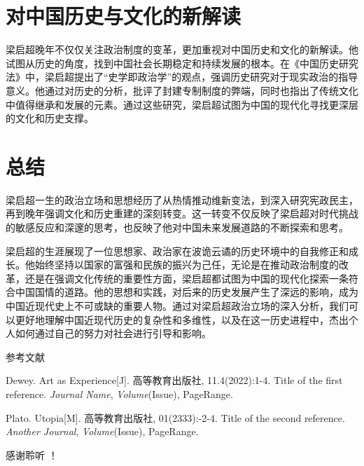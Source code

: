 \documentclass[10pt,a4paper]{beamer} %
\begin{document}
	\section{对中国历史与文化的新解读}
	\begin{frame}
		梁启超晚年不仅仅关注政治制度的变革，更加重视对中国历史和文化的新解读。他试图从历史的角度，找到中国社会长期稳定和持续发展的根本。在《中国历史研究法》中，梁启超提出了“史学即政治学”的观点，强调历史研究对于现实政治的指导意义。他通过对历史的分析，批评了封建专制制度的弊端，同时也指出了传统文化中值得继承和发展的元素。通过这些研究，梁启超试图为中国的现代化寻找更深层的文化和历史支撑。
	\end{frame}
	\section{总结}
	\begin{frame}
		梁启超一生的政治立场和思想经历了从热情推动维新变法，到深入研究宪政民主，再到晚年强调文化和历史重建的深刻转变。这一转变不仅反映了梁启超对时代挑战的敏感反应和深邃的思考，也反映了他对中国未来发展道路的不断探索和思考。
		
		梁启超的生涯展现了一位思想家、政治家在波诡云谲的历史环境中的自我修正和成长。他始终坚持以国家的富强和民族的振兴为己任，无论是在推动政治制度的改革，还是在强调文化传统的重要性方面，梁启超都试图为中国的现代化探索一条符合中国国情的道路。他的思想和实践，对后来的历史发展产生了深远的影响，成为中国近现代史上不可或缺的重要人物。通过对梁启超政治立场的深入分析，我们可以更好地理解中国近现代历史的复杂性和多维性，以及在这一历史进程中，杰出个人如何通过自己的努力对社会进行引导和影响。
	\end{frame}
	
	\appendix
	\begin{frame}{参考文献}
		\begin{thebibliography}{99} %
			Dewey. Art as Experience[J]. 高等教育出版社, 11.4(2022):1-4.
			\newblock Title of the first reference.
			\newblock \emph{Journal Name}, \emph{Volume}(Issue), PageRange.
			
			Plato. Utopia[M]. 高等教育出版社, 01(2333):-2-4.
			\newblock Title of the second reference.
			\newblock \emph{Another Journal}, \emph{Volume}(Issue), PageRange.
		\end{thebibliography}
	\end{frame}
	
	\begin{frame}[plain,c]
		\begin{center}
			\Huge 感谢聆听 ！
		\end{center}
	\end{frame}
	
\end{document}
